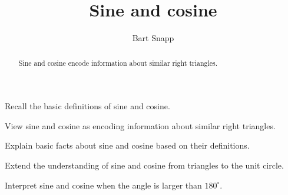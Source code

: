 \documentclass[noauthor,nooutcomes,12pt]{ximera}
\title{Sine and cosine}
\author{Bart Snapp}
\begin{document}
\begin{abstract}
  Sine and cosine encode information about similar right triangles.
\end{abstract}
\maketitle

\begin{listOutcomes}
\item Recall the basic definitions of sine and cosine.
\item View sine and cosine as encoding information about similar right
  triangles.
\item Explain basic facts about sine and cosine based on their
  definitions.
\item Extend the understanding of sine and cosine from triangles to
  the unit circle.
\item Interpret sine and cosine when the angle is larger than $180^\circ$.
\end{listOutcomes}
\mynewpage
\end{document}
